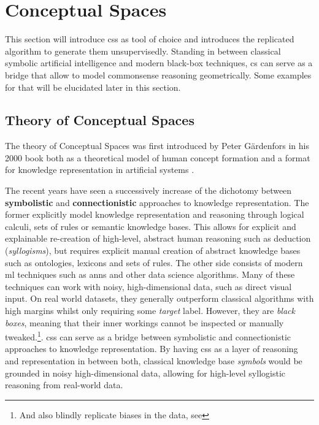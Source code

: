 \section{Conceptual Spaces}
\label{sec:cs}


This section will introduce \glspl{cs} as tool of choice and introduces the replicated algorithm to generate them unsupervisedly. Standing in between classical symbolic artificial intelligence and modern black-box techniques, \gls{cs} can serve as a bridge that allow to model commonsense reasoning geometrically. Some examples for that will be elucidated later in this section.

\subsection*{Theory of Conceptual Spaces}

The theory of Conceptual Spaces was first introduced by Peter Gärdenfors in his 2000 book  \cite{Gardenfors2000a} both as a theoretical model of human concept formation and a format for knowledge representation in artificial systems \cite{Gardenfors2004}. 

The recent years have seen a successively increase of the dichotomy between \textbf{symbolistic} and \textbf{connectionistic} approaches to knowledge representation. The former explicitly model knowledge representation and reasoning through \eg logical calculi, sets of rules or semantic knowledge bases. This allows for explicit and explainable re-creation of high-level, abstract human reasoning such as deduction (\textit{syllogisms}), but requires explicit manual creation of abstract knowledge bases such as ontologies, lexicons and sets of rules. The other side consists of modern \gls{ml} techniques such as \glspl{ann} and other data science algorithms. Many of these techniques can work with noisy, high-dimensional data, such as direct visual input. On real world datasets, they generally outperform classical algorithms with high margins whilst only requiring some \textit{target} label. However, they are \textit{black boxes}, meaning that their inner workings cannot be inspected or manually tweaked.\footnote{And also blindly replicate biases in the data, see \eg {} }. \glspl{cs} can serve as a bridge between symbolistic and connectionistic approaches to knowledge representation. By having \glspl{cs} as a layer of reasoning and representation in between both, classical knowledge base \textit{symbols} would be grounded in noisy high-dimensional data, allowing for high-level syllogistic reasoning from real-world data.

